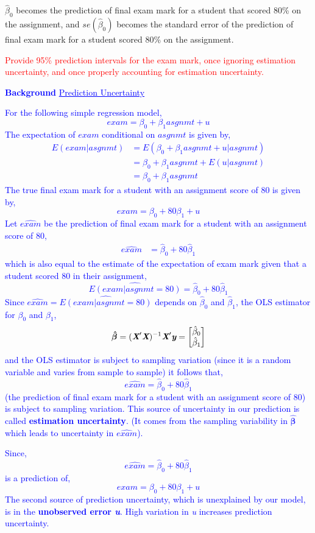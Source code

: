 \documentclass[12pt]{report}
\newenvironment{blueframed}[1][blue]
{\def\FrameCommand{\fboxsep=\FrameSep\fcolorbox{#1}{white}}%
	\MakeFramed {\advance\hsize-\width \FrameRestore}}
{\endMakeFramed}
\begin{document}
\justify \noindent $\hat{\beta}_0$ becomes the prediction of final exam mark for a student that scored 80\% on the assignment, and $se(\hat{\beta}_0)$ becomes the standard error of the prediction of final exam mark for a student scored 80\% on the assignment.

\noindent \textcolor{red}
{
	Provide 95\% prediction intervals for the exam mark, once ignoring estimation uncertainty, and once properly accounting for estimation uncertainty.
}

\justify
\begin{blueframed}
	\textcolor{blue}{\textbf{Background}}
	\vspace{-\baselineskip}
	\justify
	\textcolor{blue}{\underline{Prediction Uncertainty}}
	
	\noindent \textcolor{blue}
	{
		For the following simple regression model, $$exam = \beta_0 + \beta_1asgnmt + u$$
		The expectation of $exam$ conditional on $asgnmt$ is given by,
		\begin{align*}
		E(exam|asgnmt) &= E(\beta_0 + \beta_1asgnmt + u|asgnmt) \\
		&= \beta_0 + \beta_1asgnmt + E(u|asgnmt) \\ 
		&= \beta_0 + \beta_1asgnmt
		\end{align*}
		The true final exam mark for a student with an assignment score of 80 is given by,
		$$exam = \beta_0 + 80\beta_1 + u$$
		Let $\widehat{exam}$ be the prediction of final exam mark for a student with an assignment score of 80,
		\begin{align*}
		\widehat{exam} &= \hat{\beta}_0 + 80\hat{\beta}_1 
		\end{align*}
		which is also equal to the estimate of the expectation of exam mark given that a student scored 80 in their assignment,
		$$\widehat{E(exam|asgnmt=80)} = \hat{\beta}_0 + 80\hat{\beta}_1$$
		Since $\widehat{exam} = \widehat{E(exam|asgnmt=80)}$ depends on $\hat{\beta}_0$ and $\hat{\beta}_1$, the OLS estimator for $\beta_0$ and $\beta_1$,
		$$\boldsymbol{\hat{\beta}} = (\textit{\textbf{X}}'\textit{\textbf{X}})^{-1}\textit{\textbf{X}}'\textit{\textbf{y}} 
		= 
		\begin{bmatrix}
		\hat{\beta}_0 \\
		\hat{\beta}_1 
		\end{bmatrix} $$
		and the OLS estimator is subject to sampling variation (since it is a random variable and varies from sample to sample) it follows that, $$\widehat{exam} = \hat{\beta}_0 + 80\hat{\beta}_1$$ (the prediction of final exam mark for a student with an assignment score of 80) is subject to sampling variation. This source of uncertainty in our prediction is called \textbf{estimation uncertainty}. (It comes from the sampling variability in $\boldsymbol{\hat{\beta}}$ which leads to uncertainty in $\widehat{exam}$).
	}
	
	\noindent \textcolor{blue}
	{
		Since, $$\widehat{exam} = \hat{\beta}_0 + 80\hat{\beta}_1$$ is a prediction of, $$exam = \beta_0 + 80\beta_1 + u$$
		The second source of prediction uncertainty, which is unexplained by our model, is in the \textbf{unobserved error \textit{u}}. High variation in \textit{u} increases prediction uncertainty.
	}
\end{blueframed}
\end{document}
